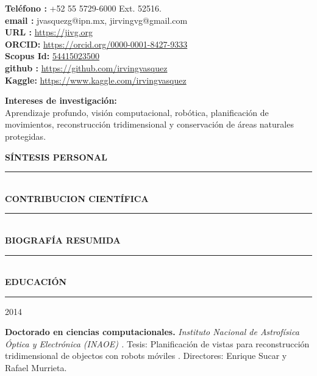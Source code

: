 \documentclass[10pt]{article}
\begin{document}
\begin{center}
\begin{minipage}[b]{0.65\linewidth}
\textbf{Teléfono \faPhone:} +52 55 5729-6000 Ext. 52516. \\
\textbf{email \faEnvelopeO:} jvasquezg@ipn.mx, jirvingvg@gmail.com\\
\textbf{URL \faExternalLink:} \url{https://jivg.org} \\
\textbf{ORCID:} \url{https://orcid.org/0000-0001-8427-9333}\\
\textbf{Scopus Id:} \href{https://www.scopus.com/authid/detail.uri?authorId=54415023500}{54415023500}\\
\textbf{github \faGithub :} \url{https://github.com/irvingvasquez} \\
\textbf{Kaggle:} \url{https://www.kaggle.com/irvingvasquez}\\
\end{minipage}

\end{center}


\begin{center}
{\bf Intereses de investigación:} \\ Aprendizaje profundo, visión computacional, robótica, planificación de movimientos, reconstrucción tridimensional y conservación de áreas naturales protegidas. 
\end{center}

{\bf SÍNTESIS PERSONAL}
\vspace{3pt}
\hrule

 \\

{\bf CONTRIBUCION CIENTÍFICA} 
\vspace{3pt}
\hrule

 \\

{\bf BIOGRAFÍA RESUMIDA}
\vspace{3pt}
\hrule

 \\
	
{\bf EDUCACIÓN}
\vspace{3pt}
\hrule

\begin{minipage}{1.5 in}
	2014\\
\end{minipage}
\begin{minipage}{4.5in}
	\textbf{Doctorado en ciencias computacionales.} \textit{Instituto Nacional de Astrofísica Óptica y Electrónica (INAOE) \href{https://www.inaoep.mx/}{\faExternalLink}.} Tesis: Planificación de vistas para reconstrucción tridimensional de objectos con robots móviles \href{https://jivasquez.files.wordpress.com/2015/03/tesis-doctorado.pdf}{\faFilePdfO}. Directores: Enrique Sucar y Rafael Murrieta.\\ 
\end{minipage}
\end{document}
